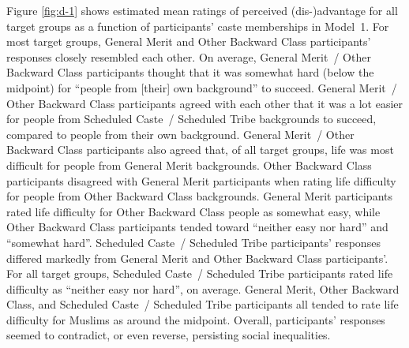 \documentclass[12pt, a4paper]{article}
\begin{document}
Figure \ref{fig:d-1} shows estimated mean ratings of perceived (dis-)advantage for all target groups as a function of participants' caste memberships in Model~1. For most target groups, General Merit and Other Backward Class participants' responses closely resembled each other. On average, General Merit~/ Other Backward Class participants thought that it was somewhat hard (below the midpoint) for ``people from [their] own background'' to succeed. General Merit~/ Other Backward Class participants agreed with each other that it was a lot easier for people from Scheduled Caste~/ Scheduled Tribe backgrounds to succeed, compared to people from their own background. General Merit~/ Other Backward Class participants also agreed that, of all target groups, life was most difficult for people from General Merit backgrounds. Other Backward Class participants disagreed with General Merit participants when rating life difficulty for people from Other Backward Class backgrounds. General Merit participants rated life difficulty for Other Backward Class people as somewhat easy, while Other Backward Class participants tended toward ``neither easy nor hard'' and ``somewhat hard''. Scheduled Caste~/ Scheduled Tribe participants' responses differed markedly from General Merit and Other Backward Class participants'. For all target groups, Scheduled Caste~/ Scheduled Tribe participants rated life difficulty as ``neither easy nor hard'', on average. General Merit, Other Backward Class, and Scheduled Caste~/ Scheduled Tribe participants all tended to rate life difficulty for Muslims as around the midpoint. Overall, participants' responses seemed to contradict, or even reverse, persisting social inequalities.
\end{document}
